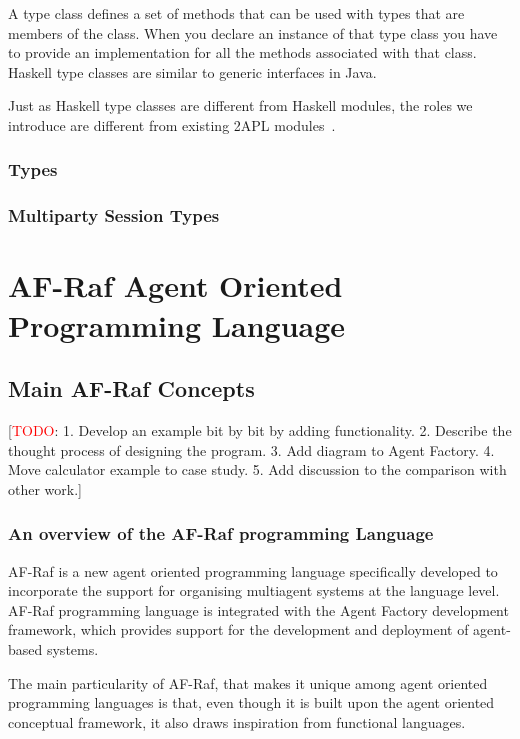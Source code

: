 \documentclass[a4paper,12pt,oneside,fleqn]{book} %
\newcommand{\todo}[1]{[\textcolor{red}{TODO}: #1]}
\begin{document}
A type class defines a set of methods that can be used with types that are
members of the class. When you declare an instance of that type class
you have to provide an implementation for all the methods associated with
that class. Haskell type classes are similar to generic interfaces in Java.

Just as Haskell type classes are different from Haskell modules, the roles
we introduce are different from existing 2APL
modules~\cite{dblp:conf/prima/dastanims08}.
\section{Types} %
\section{Multiparty Session Types} %


\part{AF-Raf Agent Oriented Programming Language} %
\chapter{Main AF-Raf Concepts}\label{ch:concepts} %

\todo{1. Develop an example bit by bit by adding functionality. 2. Describe
the thought process of designing the program. 3. Add diagram to Agent
Factory. 4. Move calculator example to case study. 5. Add discussion to the
comparison with other work.}

\section{An overview of the AF-Raf programming Language} %

AF-Raf is a new agent oriented programming language specifically developed
to incorporate the support for organising multiagent systems at the
language level. AF-Raf programming language is integrated with the
Agent Factory development framework, which provides support for the
development and deployment of agent-based systems.

The main particularity of AF-Raf, that makes it unique among agent oriented
programming languages is that, even though it is built upon the agent
oriented conceptual framework, it also draws inspiration from functional
languages.
\end{document}

